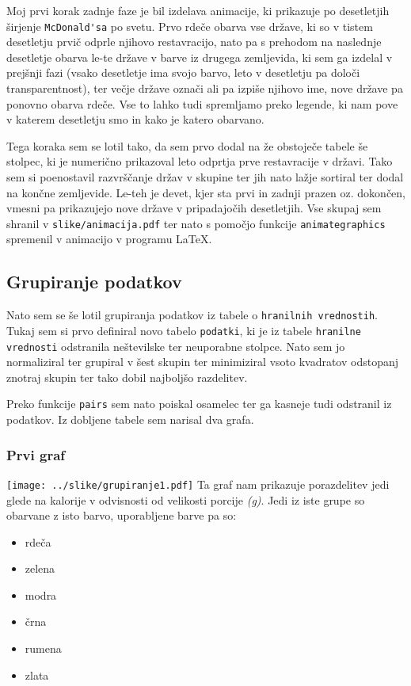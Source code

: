 \documentclass[hidelinks, 11pt,a4paper]{article}
\begin{document}
Moj prvi korak zadnje faze je bil izdelava animacije, ki prikazuje po desetletjih širjenje \verb|McDonald'sa| po svetu. Prvo rdeče obarva vse države, ki so v tistem desetletju prvič odprle njihovo restavracijo, nato pa s prehodom na naslednje desetletje obarva le-te države v barve iz drugega zemljevida, ki sem ga izdelal v prejšnji fazi (vsako desetletje ima svojo barvo, leto v desetletju pa določi transparentnost), ter večje države označi ali pa izpiše njihovo ime, nove države pa ponovno obarva rdeče. Vse to lahko tudi spremljamo preko legende, ki nam pove v katerem desetletju smo in kako je katero obarvano. \par
Tega koraka sem se lotil tako, da sem prvo dodal na že obstoječe tabele še stolpec, ki je numerično prikazoval leto odprtja prve restavracije v državi. Tako sem si poenostavil razvrščanje držav v skupine ter jih nato lažje sortiral ter dodal na končne zemljevide. Le-teh je devet, kjer sta prvi in zadnji prazen oz. dokončen, vmesni pa prikazujejo nove države v pripadajočih desetletjih. Vse skupaj sem shranil v \verb|slike/animacija.pdf| ter nato s pomočjo funkcije \verb|animategraphics| spremenil v animacijo v programu \LaTeX. \\[1em]

\subsection{Grupiranje podatkov}
Nato sem se še lotil grupiranja podatkov iz tabele o \verb|hranilnih vrednostih|. Tukaj sem si prvo definiral novo tabelo \verb|podatki|, ki je iz tabele \verb|hranilne| \verb|vrednosti| odstranila neštevilske ter neuporabne stolpce. Nato sem jo normaliziral ter grupiral v šest skupin ter minimiziral vsoto kvadratov odstopanj znotraj skupin ter tako dobil najboljšo razdelitev. \par
Preko funkcije \verb|pairs| sem nato poiskal osamelec ter ga kasneje tudi odstranil iz podatkov. Iz dobljene tabele sem narisal dva grafa.

\subsubsection{Prvi graf}
\texttt{[image: ../slike/grupiranje1.pdf]}
Ta graf nam prikazuje porazdelitev jedi glede na kalorije v odvisnosti od velikosti porcije \textit{(g)}. Jedi iz iste grupe so obarvane z isto barvo, uporabljene barve pa so:
\begin{itemize}
	\item rdeča
	\item zelena
	\item modra
	\item črna
	\item rumena
	\item zlata
\end{itemize}
\end{document}
